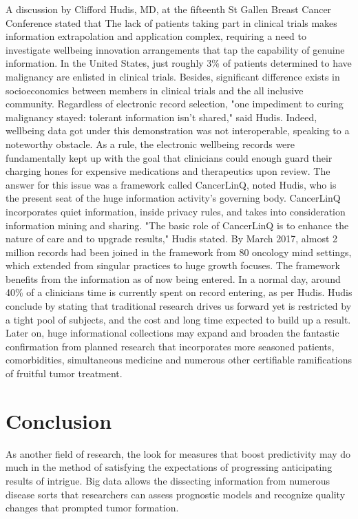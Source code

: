 \documentclass[sigconf]{acmart}
\begin{document}
A discussion by Clifford Hudis, MD, at the fifteenth St Gallen Breast Cancer Conference stated that The lack of patients taking part in clinical trials makes information extrapolation and application complex, requiring a need to investigate wellbeing innovation arrangements that tap the capability of genuine information\cite{vir}. 
In the United States, just roughly 3\% of patients determined to have malignancy are enlisted in clinical trials. Besides, significant difference exists in socioeconomics between members in clinical trials and the all inclusive community. Regardless of electronic record selection, "one impediment to curing malignancy stayed: tolerant information isn't shared," said Hudis. Indeed, wellbeing data got under this demonstration was not interoperable, speaking to a noteworthy obstacle. As a rule, the electronic wellbeing records were fundamentally kept up with the goal that clinicians could enough guard their charging hones for expensive medications and therapeutics upon review.
The answer for this issue was a framework called CancerLinQ, noted Hudis, who is the present seat of the huge information activity's governing body. CancerLinQ incorporates quiet information, inside privacy rules, and takes into consideration information mining and sharing. "The basic role of CancerLinQ is to enhance the nature of care and to upgrade results," Hudis stated\cite{vir}.
By March 2017, almost 2 million records had been joined in the framework from 80 oncology mind settings, which extended from singular practices to huge growth focuses. The framework benefits from the information as of now being entered. In a normal day, around 40\% of a clinicians time is currently spent on record entering, as per Hudis.
Hudis conclude by stating that traditional research drives us forward yet is restricted by a tight pool of subjects, and the cost and long time expected to build up a result. Later on, huge informational collections may expand and broaden the fantastic confirmation from planned research that incorporates more seasoned patients, comorbidities, simultaneous medicine and numerous other certifiable ramifications of fruitful tumor treatment\cite{vir}.



\section{Conclusion}

As another field of research, the look for measures that boost predictivity may do much in the method of satisfying the expectations of progressing anticipating results of intrigue. Big data allows the dissecting information from numerous disease sorts that researchers can assess prognostic models and recognize quality changes that prompted tumor formation.
\end{document}
